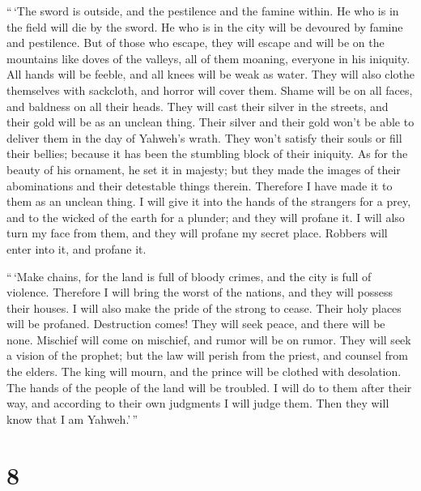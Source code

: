  ``\,`The sword is outside, and the pestilence and the
famine within. He who is in the field will die by the sword. He who is
in the city will be devoured by famine and pestilence. 
But of those who escape, they will escape and will be on the mountains
like doves of the valleys, all of them moaning, everyone in his
iniquity.  All hands will be feeble, and all knees will
be weak as water.  They will also clothe themselves with
sackcloth, and horror will cover them. Shame will be on all faces, and
baldness on all their heads.  They will cast their silver
in the streets, and their gold will be as an unclean thing. Their silver
and their gold won't be able to deliver them in the day of Yahweh's
wrath. They won't satisfy their souls or fill their bellies; because it
has been the stumbling block of their iniquity.  As for
the beauty of his ornament, he set it in majesty; but they made the
images of their abominations and their detestable things therein.
Therefore I have made it to them as an unclean thing.  I
will give it into the hands of the strangers for a prey, and to the
wicked of the earth for a plunder; and they will profane it.
 I will also turn my face from them, and they will
profane my secret place. Robbers will enter into it, and profane it.

 ``\,`Make chains, for the land is full of bloody crimes,
and the city is full of violence.  Therefore I will bring
the worst of the nations, and they will possess their houses. I will
also make the pride of the strong to cease. Their holy places will be
profaned.  Destruction comes! They will seek peace, and
there will be none.  Mischief will come on mischief, and
rumor will be on rumor. They will seek a vision of the prophet; but the
law will perish from the priest, and counsel from the elders.
 The king will mourn, and the prince will be clothed with
desolation. The hands of the people of the land will be troubled. I will
do to them after their way, and according to their own judgments I will
judge them. Then they will know that I am Yahweh.'\,''

\hypertarget{section-7}{%
\section{8}\label{section-7}}

